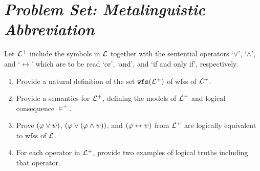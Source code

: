 \documentclass[a4paper, 11pt]{article} %
\begin{document}
\section*{\it Problem Set: Metalinguistic Abbreviation}

Let $\mathcal{L}^+$ include the symbols in $\mathcal{L}$ together with the sentential operators `$\vee$', `$\wedge$', and `$\leftrightarrow$' which are to be read `or', `and', and `if and only if', respectively.
\begin{enumerate}\small
  \item Provide a natural definition of the set $\texttt{wfs}(\mathcal{L}^+)$ of wfss of $\mathcal{L}^+$.
  \item Provide a semantics for $\mathcal{L}^+$, defining the models of $\mathcal{L}^+$ and logical consequence $\vDash^+$.
  \item Prove $(\varphi \vee \psi)$, $(\varphi \vee (\varphi \wedge \psi))$, and $(\varphi\leftrightarrow \psi)$ from $\mathcal{L}^+$ are logically equivalent to wfss of $\mathcal{L}$.
  \item For each operator in $\mathcal{L}^+$, provide two examples of logical truths including that operator.
\end{enumerate}

\end{document}
